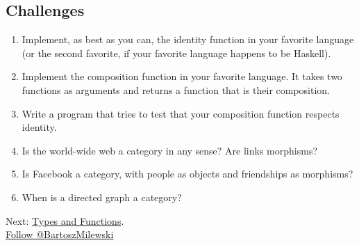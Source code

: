 \subsection{Challenges}\label{challenges}

\begin{enumerate}
\tightlist
\item
  Implement, as best as you can, the identity function in your favorite
  language (or the second favorite, if your favorite language happens to
  be Haskell).
\item
  Implement the composition function in your favorite language. It takes
  two functions as arguments and returns a function that is their
  composition.
\item
  Write a program that tries to test that your composition function
  respects identity.
\item
  Is the world-wide web a category in any sense? Are links morphisms?
\item
  Is Facebook a category, with people as objects and friendships as
  morphisms?
\item
  When is a directed graph a category?
\end{enumerate}

Next:
\href{https://bartoszmilewski.com/2014/11/24/types-and-functions/}{Types
and Functions}.\\
\href{https://twitter.com/BartoszMilewski}{Follow @BartoszMilewski}
